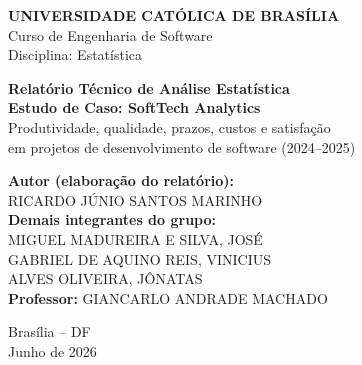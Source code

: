 \documentclass[a4paper, 12pt]{article}
\begin{document}
\begin{titlepage}
	\begin{center}
		\Large{\textbf{UNIVERSIDADE CATÓLICA DE BRASÍLIA}}\\
		\large{Curso de Engenharia de Software}\\
		\large{Disciplina: Estatística}\\
		\vspace{95pt}

		\textbf{\LARGE{Relatório Técnico de Análise Estatística}}\\
		\vspace{12pt}
		\textbf{\Large{Estudo de Caso: SoftTech Analytics}}\\
		\vspace{6pt}
		\large{Produtividade, qualidade, prazos, custos e satisfação\\
		em projetos de desenvolvimento de software (2024--2025)}\\
		\vspace{3.5cm}
	\end{center}

	\begin{flushleft}
		\textbf{Autor (elaboração do relatório):}\\[4pt]
		RICARDO JÚNIO SANTOS MARINHO\\[10pt]
		\textbf{Demais integrantes do grupo:}\\[4pt]
		MIGUEL MADUREIRA E SILVA, JOSÉ\\
		GABRIEL DE AQUINO REIS, VINICIUS\\
		ALVES OLIVEIRA, JÔNATAS\\[10pt]
		\textbf{Professor:} GIANCARLO ANDRADE MACHADO\\
	\end{flushleft}

	\begin{center}
		\vspace{\fill}
		Brasília -- DF\\
		Junho de 2026
	\end{center}
\end{titlepage}
\end{document}

